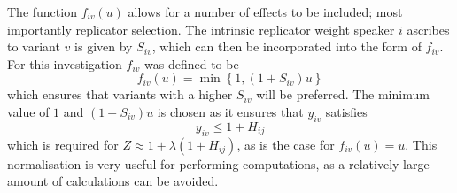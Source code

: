 \documentclass[12pt]{article}
\begin{document}
The function $f_{iv}(u)$ allows for a number of effects to be included; most importantly replicator selection. The intrinsic replicator weight speaker $i$ ascribes to variant $v$ is given by $S_{iv}$, which can then be incorporated into the form of $f_{iv}$. For this investigation $f_{iv}$ was defined to be
\begin{equation}\label{f}
f_{iv}(u) = \min \left\lbrace 1, (1 + S_{iv})u \right\rbrace
\end{equation}
which ensures that variants with a higher $S_{iv}$ will be preferred. The minimum value of $1$ and $(1 + S_{iv})u$ is chosen as it ensures that $y_{iv}$ satisfies
\begin{equation}
y_{iv} \leq 1 + H_{ij}
\end{equation}
which is required for $Z \approx 1 + \lambda (1 + H_{ij})$, as is the case for $f_{iv}(u) = u$. This normalisation is very useful for performing computations, as a relatively large amount of calculations can be avoided.   
\end{document}
